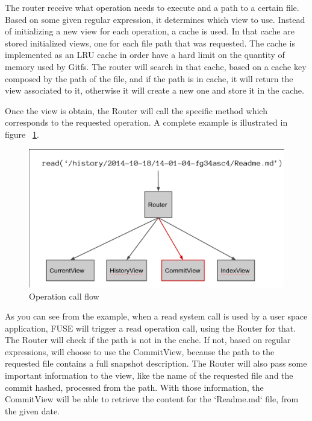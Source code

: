 The router receive what operation needs to execute and a path to a certain file. Based on some given regular expression, it determines which view to use. Instead of initializing a new view for each operation, a cache is used. In that cache are stored initialized views, one for each file path that was requested. The cache is implemented as an LRU cache in order have a hard limit on the quantity of memory used by Gitfs. The router will search in that cache, based on a cache key composed by the path of the file, and if the path is in cache, it will return the view associated to it, otherwise it will create a new one and store it in the cache.

Once the view is obtain, the Router will call the specific method which corresponds to the requested operation. A complete example is illustrated in figure ~\ref{fig:routing}.

\begin{figure}[h]
  \begin{center}
    \includegraphics[width=15cm]{layout/router.png}
  \end{center}
  \caption{Operation call flow}
  \label{fig:routing}
\end{figure}

As you can see from the example, when a read system call is used by a user space application, FUSE will trigger a read operation call, using the Router for that. The Router will check if the path is not in the cache. If not, based on regular expressions, will choose to use the CommitView, because the path to the requested file contains a full snapshot description. The Router will also pass some important information to the view, like the name of the requested file and the commit hashed, processed from the path. With those information, the CommitView will be able to retrieve the content for the `Readme.md` file, from the given date. 

